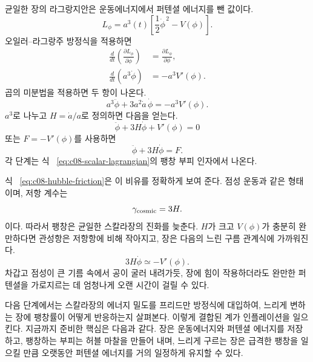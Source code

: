 균일한 장의 라그랑지안은 운동에너지에서 퍼텐셜 에너지를 뺀 값이다.
\begin{equation}
L_\phi=a^3(t)
\left[
\frac12\dot\phi^{\,2}-V(\phi)
\right].
\label{eq:c08-scalar-lagrangian}
\end{equation}
오일러--라그랑주 방정식을 적용하면
\begin{align}
\frac{d}{dt}\left(\frac{\partial L_\phi}{\partial\dot\phi}\right)
&=
\frac{\partial L_\phi}{\partial\phi},\\
\frac{d}{dt}\left(a^3\dot\phi\right)
&=-a^3V'(\phi).
\end{align}
곱의 미분법을 적용하면 두 항이 나온다.
\begin{equation}
a^3\ddot\phi+3a^2\dot a\,\dot\phi
=-a^3V'(\phi).
\end{equation}
\(a^3\)로 나누고 \(H=\dot a/a\)로 정의하면 다음을 얻는다.
\begin{equation}
\boxed{
\ddot\phi+3H\dot\phi+V'(\phi)=0
}
\label{eq:c08-hubble-friction}
\end{equation}
또는 \(F=-V'(\phi)\)를 사용하면
\begin{equation}
\ddot\phi+3H\dot\phi=F.
\end{equation}
각 단계는 식 ~\eqref{eq:c08-scalar-lagrangian}의 팽창 부피 인자에서 나온다.

\begin{classroomqa}
\end{classroomqa}

식 ~\eqref{eq:c08-hubble-friction}은 이 비유를 정확하게 보여 준다. 점성 운동과 같은 형태이며, 저항 계수는
\begin{equation}
\gamma_{\rm cosmic}=3H.
\end{equation}
이다. 따라서 팽창은 균일한 스칼라장의 진화를 늦춘다. \(H\)가 크고 \(V(\phi)\)가 충분히 완만하다면 관성항은 저항항에 비해 작아지고, 장은 다음의 느린 구름 관계식에 가까워진다.
\begin{equation}
3H\dot\phi\simeq-V'(\phi).
\end{equation}
차갑고 점성이 큰 기름 속에서 공이 굴러 내려가듯, 장에 힘이 작용하더라도 완만한 퍼텐셜을 가로지르는 데 엄청나게 오랜 시간이 걸릴 수 있다.

다음 단계에서는 스칼라장의 에너지 밀도를 프리드만 방정식에 대입하여, 느리게 변하는 장에 팽창률이 어떻게 반응하는지 살펴본다. 이렇게 결합된 계가 인플레이션을 일으킨다. 지금까지 준비한 핵심은 다음과 같다. 장은 운동에너지와 퍼텐셜 에너지를 저장하고, 팽창하는 부피는 허블 마찰을 만들어 내며, 느리게 구르는 장은 급격한 팽창을 일으킬 만큼 오랫동안 퍼텐셜 에너지를 거의 일정하게 유지할 수 있다.

